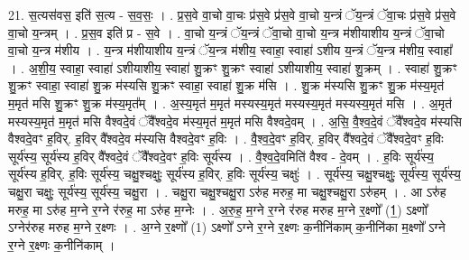\documentclass[17pt]{extarticle}
\begin{document}
21. स॒त्यस॑वस॒ इति॑ स॒त्य - स॒व॒सः॒ । . प्र॒स॒वे वा॒चो वा॒चः प्र॑स॒वे प्र॑स॒वे वा॒चो य॒न्त्रं ॅय॒न्त्रं ॅवा॒चः प्र॑स॒वे प्र॑स॒वे वा॒चो य॒न्त्रम् । . प्र॒स॒व इति॑ प्र - स॒वे । . वा॒चो य॒न्त्रं ॅय॒न्त्रं ॅवा॒चो वा॒चो य॒न्त्र म॑शीयाशीय य॒न्त्रं ॅवा॒चो वा॒चो य॒न्त्र म॑शीय । . य॒न्त्र म॑शीयाशीय य॒न्त्रं ॅय॒न्त्र म॑शीय॒ स्वाहा॒ स्वाहा॑ ऽशीय य॒न्त्रं ॅय॒न्त्र म॑शीय॒ स्वाहा᳚ । . अ॒शी॒य॒ स्वाहा॒ स्वाहा॑ ऽशीयाशीय॒ स्वाहा॑ शु॒क्रꣳ शु॒क्रꣳ स्वाहा॑ ऽशीयाशीय॒ स्वाहा॑ शु॒क्रम् । . स्वाहा॑ शु॒क्रꣳ शु॒क्रꣳ स्वाहा॒ स्वाहा॑ शु॒क्र म॑स्यसि शु॒क्रꣳ स्वाहा॒ स्वाहा॑ शु॒क्र म॑सि । . शु॒क्र म॑स्यसि शु॒क्रꣳ शु॒क्र म॑स्य॒मृत॑ म॒मृत॑ मसि शु॒क्रꣳ शु॒क्र म॑स्य॒मृत᳚म् । . अ॒स्य॒मृत॑ म॒मृत॑ मस्यस्य॒मृत॑ मस्यस्य॒मृत॑ मस्यस्य॒मृत॑ मसि । . अ॒मृत॑ मस्यस्य॒मृत॑ म॒मृत॑ मसि वैश्वदे॒वं ॅवै᳚श्वदे॒व म॑स्य॒मृत॑ म॒मृत॑ मसि वैश्वदे॒वम् । . अ॒सि॒ वै॒श्व॒दे॒वं ॅवै᳚श्वदे॒व म॑स्यसि वैश्वदे॒वꣳ ह॒विर्. ह॒विर् वै᳚श्वदे॒व म॑स्यसि वैश्वदे॒वꣳ ह॒विः । . वै॒श्व॒दे॒वꣳ ह॒विर्. ह॒विर् वै᳚श्वदे॒वं ॅवै᳚श्वदे॒वꣳ ह॒विः सूर्य॑स्य॒ सूर्य॑स्य ह॒विर् वै᳚श्वदे॒वं ॅवै᳚श्वदे॒वꣳ ह॒विः सूर्य॑स्य । . वै॒श्व॒दे॒वमिति॑ वैश्व - दे॒वम् । . ह॒विः सूर्य॑स्य॒ सूर्य॑स्य ह॒विर्. ह॒विः सूर्य॑स्य॒ चक्षु॒श्चक्षुः॒ सूर्य॑स्य ह॒विर्. ह॒विः सूर्य॑स्य॒ चक्षुः॑ । . सूर्य॑स्य॒ चक्षु॒श्चक्षुः॒ सूर्य॑स्य॒ सूर्य॑स्य॒ चक्षु॒रा चक्षुः॒ सूर्य॑स्य॒ सूर्य॑स्य॒ चक्षु॒रा । . चक्षु॒रा चक्षु॒श्चक्षु॒रा ऽरु॑ह मरुह॒ मा चक्षु॒श्चक्षु॒रा ऽरु॑हम् । . आ ऽरु॑ह मरुह॒ मा ऽरु॑ह म॒ग्ने र॒ग्ने र॑रुह॒ मा ऽरु॑ह म॒ग्नेः । . अ॒रु॒ह॒ म॒ग्ने र॒ग्ने र॑रुह मरुह म॒ग्ने र॒क्ष्णो᳚ (1॒) ऽक्ष्णो᳚ ऽग्नेर॑रुह मरुह म॒ग्ने र॒क्ष्णः । . अ॒ग्ने र॒क्ष्णो᳚ (1) ऽक्ष्णो᳚ ऽग्ने र॒ग्ने र॒क्ष्णः क॒नीनि॑काम् क॒नीनि॑का म॒क्ष्णो᳚ ऽग्ने र॒ग्ने र॒क्ष्णः क॒नीनि॑काम् । \newline
\end{document}
